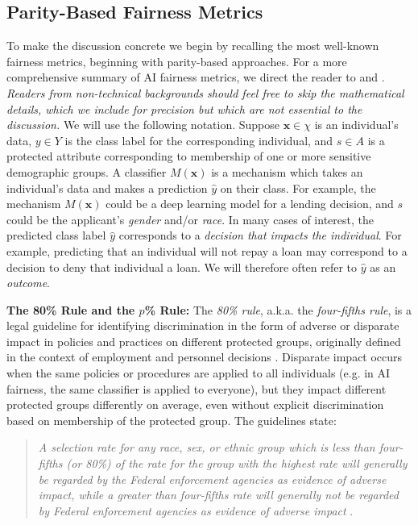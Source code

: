 \documentclass[11pt,dvipdfm]{article}
\begin{document}
\subsection{Parity-Based Fairness Metrics}
To make the discussion concrete we begin by recalling the most well-known fairness metrics, beginning with parity-based approaches. For a more comprehensive summary of AI fairness metrics, we direct the reader to \cite{berk2017fairness} and \cite{20plusdefinitionssuervey}.  \emph{Readers from non-technical backgrounds should feel free to skip the mathematical details, which we include for precision but which are not essential to the discussion.}  We will use the following notation.  Suppose $\mathbf{x} \in \chi$ is an individual's data, $y \in Y$ is the class label for the corresponding individual, and $s \in A$ is a protected attribute corresponding to membership of one or more sensitive demographic groups.  A classifier $M(\mathbf{x})$ is a mechanism which takes an individual's data and makes a prediction $\hat{y}$ on their class. For example, the mechanism $M(\mathbf{x})$ could be a deep learning model for a lending decision, and $s$ could be the applicant's \emph{gender} and/or \emph{race}.  In many cases of interest, the predicted class label $\hat{y}$ corresponds to a \emph{decision that impacts the individual}.  For example, predicting that an individual will not repay a loan may correspond to a decision to deny that individual a loan.  We will therefore often refer to $\hat{y}$ as an \emph{outcome}. 

\noindent \textbf{The 80\% Rule and the $p$\% Rule:} The \emph{80\% rule}, a.k.a. the \emph{four-fifths rule}, is a legal guideline for identifying discrimination in the form of adverse or disparate impact in policies and practices on different protected groups, originally defined in the context of employment and personnel decisions \cite{eeoc1966guidelines}.  Disparate impact occurs when the same policies or procedures are applied to all individuals (e.g. in AI fairness, the same classifier is applied to everyone), but they impact different protected groups differently on average, even without explicit discrimination based on membership of the protected group.  The guidelines state:
\begin{quote}
\emph{
A selection rate for any race, sex, or ethnic group which is less than four-fifths (or 80\%) of the rate for the group with the highest rate will generally be regarded by the Federal enforcement agencies as evidence of adverse impact, while a greater than four-fifths rate will generally not be regarded by Federal enforcement agencies as evidence of adverse impact} \cite{eeoc1966guidelines}.
\end{quote}
\end{document}
